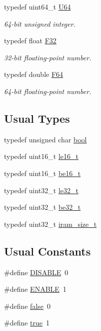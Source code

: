 \begin{DoxyCompactItemize}
typedef uint64\+\_\+t \mbox{\hyperlink{group__group__sam0__utils_ga25809e0734a149248fcf5831efa4e33d}{U64}}
\begin{DoxyCompactList}\small\item\em 64-\/bit unsigned integer. \end{DoxyCompactList}\item 
typedef float \mbox{\hyperlink{group__group__sam0__utils_ga841d3674577a1e86afdc2f4845f46c4b}{F32}}
\begin{DoxyCompactList}\small\item\em 32-\/bit floating-\/point number. \end{DoxyCompactList}\item 
typedef double \mbox{\hyperlink{group__group__sam0__utils_gadc9896ee12db3bb116fc63b3464c72c7}{F64}}
\begin{DoxyCompactList}\small\item\em 64-\/bit floating-\/point number. \end{DoxyCompactList}\end{DoxyCompactItemize}
\subsection*{Usual Types}
\begin{DoxyCompactItemize}
\item 
typedef unsigned char \mbox{\hyperlink{group__group__sam0__utils_ga97a80ca1602ebf2303258971a2c938e2}{bool}}
\item 
typedef uint16\+\_\+t \mbox{\hyperlink{group__group__sam0__utils_gadb35b8c1c002c23dcc87bdd8f520dd5f}{le16\+\_\+t}}
\item 
typedef uint16\+\_\+t \mbox{\hyperlink{group__group__sam0__utils_gadafc3ed99e530f27d0d954334c389748}{be16\+\_\+t}}
\item 
typedef uint32\+\_\+t \mbox{\hyperlink{group__group__sam0__utils_ga14351c68ce47837d05ce857cfff07c92}{le32\+\_\+t}}
\item 
typedef uint32\+\_\+t \mbox{\hyperlink{group__group__sam0__utils_ga3410b85f2a5afdf8b35f5c7c3414fe2d}{be32\+\_\+t}}
\item 
typedef uint32\+\_\+t \mbox{\hyperlink{group__group__sam0__utils_ga2aa1108d10dcbee73bb35aefe25287c1}{iram\+\_\+size\+\_\+t}}
\end{DoxyCompactItemize}
\subsection*{Usual Constants}
\begin{DoxyCompactItemize}
\item 
\#define \mbox{\hyperlink{group__group__sam0__utils_ga99496f7308834e8b220f7894efa0b6ab}{D\+I\+S\+A\+B\+LE}}~0
\item 
\#define \mbox{\hyperlink{group__group__sam0__utils_ga514ad415fb6125ba296793df7d1a468a}{E\+N\+A\+B\+LE}}~1
\item 
\#define \mbox{\hyperlink{group__group__sam0__utils_ga65e9886d74aaee76545e83dd09011727}{false}}~0
\item 
\#define \mbox{\hyperlink{group__group__sam0__utils_ga41f9c5fb8b08eb5dc3edce4dcb37fee7}{true}}~1
\end{DoxyCompactItemize}
